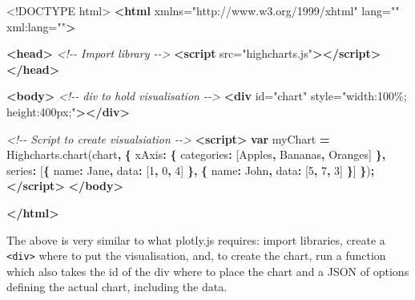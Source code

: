 \documentclass[
]{krantz}
\makeatletter
\newenvironment{Shaded}{\begin{snugshade}}{\end{snugshade}}
\newcommand{\AttributeTok}[1]{\textcolor[rgb]{0.61,0.61,0.61}{#1}}
\newcommand{\CommentTok}[1]{\textcolor[rgb]{0.37,0.37,0.37}{\textit{#1}}}
\newcommand{\DataTypeTok}[1]{\textcolor[rgb]{0.27,0.27,0.27}{#1}}
\newcommand{\DecValTok}[1]{\textcolor[rgb]{0.06,0.06,0.06}{#1}}
\newcommand{\KeywordTok}[1]{\textcolor[rgb]{0.27,0.27,0.27}{\textbf{#1}}}
\newcommand{\NormalTok}[1]{#1}
\newcommand{\OperatorTok}[1]{\textcolor[rgb]{0.43,0.43,0.43}{\textbf{#1}}}
\newcommand{\OtherTok}[1]{\textcolor[rgb]{0.37,0.37,0.37}{#1}}
\newcommand{\StringTok}[1]{\textcolor[rgb]{0.5,0.5,0.5}{#1}}
\newcommand{\VariableTok}[1]{\textcolor[rgb]{0,0,0}{#1}}
\newenvironment{kframe}{%
\medskip{}
\setlength{\fboxsep}{.8em}
 \def\at@end@of@kframe{}%
 \ifinner\ifhmode%
  \def\at@end@of@kframe{\end{minipage}}%
  \begin{minipage}{\columnwidth}%
 \fi\fi%
 \def\FrameCommand##1{\hskip\@totalleftmargin \hskip-\fboxsep
 \colorbox{shadecolor}{##1}\hskip-\fboxsep
     \hskip-\linewidth \hskip-\@totalleftmargin \hskip\columnwidth}%
 \MakeFramed {\advance\hsize-\width
   \@totalleftmargin\z@ \linewidth\hsize
   \@setminipage}}%
 {\par\unskip\endMakeFramed%
 \at@end@of@kframe}
\renewenvironment{Shaded}{\begin{kframe}}{\end{kframe}}
\makeatother
\begin{document}
\begin{Shaded}
\begin{Highlighting}[]
\DataTypeTok{<!DOCTYPE }\NormalTok{html}\DataTypeTok{>}
\KeywordTok{<html}\OtherTok{ xmlns=}\StringTok{"http://www.w3.org/1999/xhtml"}\OtherTok{ lang=}\StringTok{""}\OtherTok{ xml:lang=}\StringTok{""}\KeywordTok{>}

\KeywordTok{<head>}
  \CommentTok{<!{-}{-} Import library {-}{-}>}
  \KeywordTok{<script}\OtherTok{ src=}\StringTok{"highcharts.js"}\KeywordTok{></script>}
\KeywordTok{</head>}

\KeywordTok{<body>}
  \CommentTok{<!{-}{-} div to hold visualisation {-}{-}>}
  \KeywordTok{<div}\OtherTok{ id=}\StringTok{"chart"}\OtherTok{ style=}\StringTok{"width:100\%; height:400px;"}\KeywordTok{></div>}

  \CommentTok{<!{-}{-} Script to create visualsiation {-}{-}>}
  \KeywordTok{<script>}
    \KeywordTok{var}\NormalTok{ myChart }\OperatorTok{=} \VariableTok{Highcharts}\NormalTok{.}\AttributeTok{chart}\NormalTok{(}\StringTok{\textquotesingle{}chart\textquotesingle{}}\OperatorTok{,} \OperatorTok{\{}
        \DataTypeTok{xAxis}\OperatorTok{:} \OperatorTok{\{}
            \DataTypeTok{categories}\OperatorTok{:}\NormalTok{ [}\StringTok{\textquotesingle{}Apples\textquotesingle{}}\OperatorTok{,} \StringTok{\textquotesingle{}Bananas\textquotesingle{}}\OperatorTok{,} \StringTok{\textquotesingle{}Oranges\textquotesingle{}}\NormalTok{]}
        \OperatorTok{\},}
        \DataTypeTok{series}\OperatorTok{:}\NormalTok{ [}\OperatorTok{\{}
            \DataTypeTok{name}\OperatorTok{:} \StringTok{\textquotesingle{}Jane\textquotesingle{}}\OperatorTok{,}
            \DataTypeTok{data}\OperatorTok{:}\NormalTok{ [}\DecValTok{1}\OperatorTok{,} \DecValTok{0}\OperatorTok{,} \DecValTok{4}\NormalTok{]}
        \OperatorTok{\},} \OperatorTok{\{}
            \DataTypeTok{name}\OperatorTok{:} \StringTok{\textquotesingle{}John\textquotesingle{}}\OperatorTok{,}
            \DataTypeTok{data}\OperatorTok{:}\NormalTok{ [}\DecValTok{5}\OperatorTok{,} \DecValTok{7}\OperatorTok{,} \DecValTok{3}\NormalTok{]}
        \OperatorTok{\}}\NormalTok{]}
    \OperatorTok{\}}\NormalTok{)}\OperatorTok{;}
  \KeywordTok{</script>}
\KeywordTok{</body>}

\KeywordTok{</html>}
\end{Highlighting}
\end{Shaded}

The above is very similar to what plotly.js requires: import libraries, create a \texttt{\textless{}div\textgreater{}} where to put the visualisation, and, to create the chart, run a function which also takes the id of the div where to place the chart and a JSON of options defining the actual chart, including the data.
\end{document}

